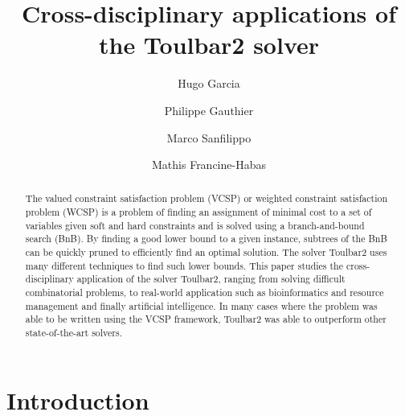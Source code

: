 \documentclass[runningheads]{llncs}
\begin{document}
\title{Cross-disciplinary applications of the Toulbar2 solver}
%
%
\author{Hugo Garcia \and
Philippe Gauthier \and
Marco Sanfilippo \and
Mathis Francine-Habas}



\maketitle


\begin{abstract}
    The valued constraint satisfaction problem (VCSP) or weighted constraint satisfaction problem (WCSP) is a problem of finding an assignment of minimal cost to a set of variables given soft and hard constraints and is solved using a branch-and-bound search (BnB). By finding a good lower bound to a given instance, subtrees of the BnB can be quickly pruned to efficiently find an optimal solution. The solver Toulbar2 uses many different techniques to find such lower bounds. This paper studies the cross-disciplinary application of the solver Toulbar2, ranging from solving difficult combinatorial problems, to real-world application such as bioinformatics and resource management and finally artificial intelligence. In many cases where the problem was able to be written using the VCSP framework, Toulbar2 was able to outperform other state-of-the-art solvers.

\end{abstract}


\section{Introduction}
\end{document}
